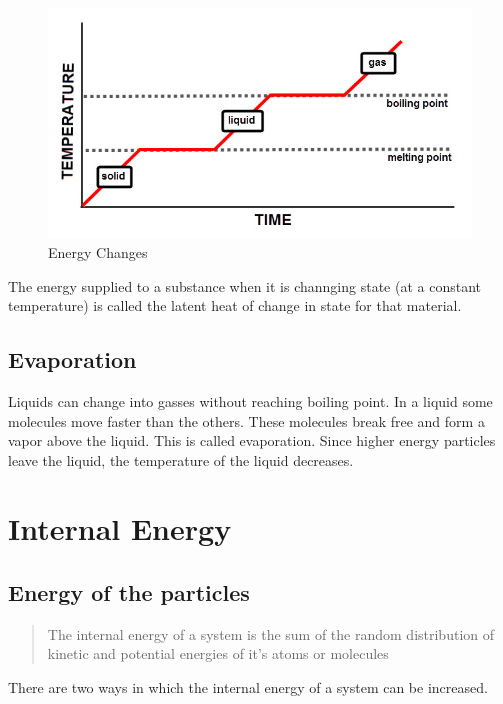 \documentclass{scrbook}
\begin{document}
       \begin{figure}[h]
	       \caption{Energy Changes \cite{edplace:ech}}
               \label{energych}
               \includegraphics[width=\linewidth]{assets/EnergyChanges.jpg}
       \end{figure}

       The energy supplied to a substance when it is channging state (at a constant temperature) is called the latent heat of change in state for that material.

\subsection{Evaporation}

	Liquids can change into gasses without reaching boiling point. In a liquid some molecules move faster than the others. These molecules break free and form a vapor above the liquid. This is called evaporation. Since higher energy particles leave the liquid, the temperature of the liquid decreases.

\section{Internal Energy}

\subsection{Energy of the particles}

	\begin{quote}
		The internal energy of a system is the sum of the random distribution of kinetic and potential energies of it's atoms or molecules
	\end{quote}

	There are two ways in which the internal energy of a system can be increased.
\end{document}
